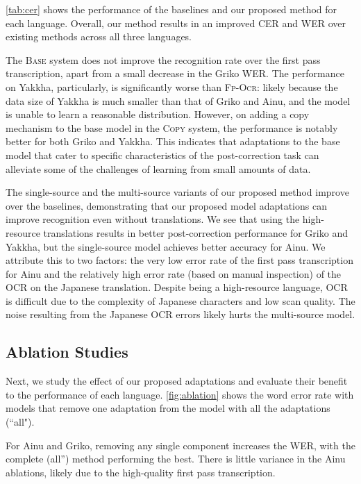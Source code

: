 \autoref{tab:cer} shows the performance of the baselines and our proposed method for each language. Overall, our method results in an improved CER and WER over existing methods across all three languages. 

The \textsc{Base} system does not improve the recognition rate over the first pass transcription, apart from a small decrease in the Griko WER. The performance on Yakkha, particularly, is significantly worse than \textsc{Fp-Ocr}: likely because the data size of Yakkha is much smaller than that of Griko and Ainu, and the model is unable to learn a reasonable distribution. However, on adding a copy mechanism to the base model in the \textsc{Copy} system, the performance is notably better for both Griko and Yakkha. This indicates that adaptations to the base model that cater to specific characteristics of the post-correction task can alleviate some of the challenges of learning from small amounts of data.

The single-source and the multi-source variants of our proposed method improve over the baselines, demonstrating that our proposed model adaptations can improve recognition even without translations. We see that using the high-resource translations results in better post-correction performance for Griko and Yakkha, but the single-source model achieves better accuracy for Ainu. We attribute this to two factors: the very low error rate of the first pass transcription for Ainu and the relatively high error rate (based on manual inspection) of the OCR on the Japanese translation. Despite being a high-resource language, OCR is difficult due to the complexity of Japanese characters and low scan quality. The noise resulting from the Japanese OCR errors likely hurts the multi-source model.



\subsection{Ablation Studies}


Next, we study the effect of our proposed adaptations and evaluate their benefit to the performance of each language. \autoref{fig:ablation} shows the word error rate with models that remove one adaptation from the model with all the adaptations (``all").

For Ainu and Griko, removing any single component increases the WER, with the complete (\ba\ba all'') method performing the best. There is little variance in the Ainu ablations, likely due to the high-quality first pass transcription. 

